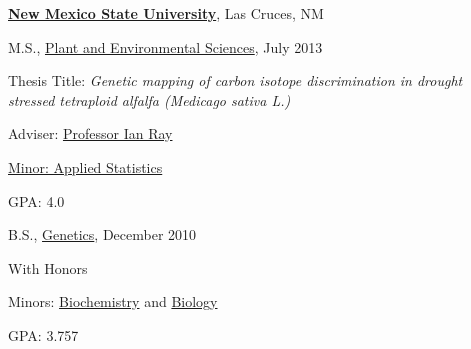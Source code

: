 \documentclass[10pt]{article}
\renewcommand{\section}[1]{\pagebreak[3]%
    \vspace{1.3\baselineskip}%
    \phantomsection\addcontentsline{toc}{section}{#1}%
    \noindent\llap{\scshape\smash{\parbox[t]{\marginparwidth}{\hyphenpenalty=10000\raggedright #1}}}%
    \vspace{-\baselineskip}\par}
\newcommand{\blankline}{\quad\pagebreak[3]}
\begin{document}
\blankline
\href{https://www.nmsu.edu/}{\textbf{New Mexico State University}},
Las Cruces, NM
\begin{outerlist}

\item[] M.S.,
        \href{https://www.nmsu.edu/}
             {Plant and Environmental Sciences}, July 2013
        \begin{innerlist}
        \item Thesis Title: \emph{Genetic mapping of carbon isotope discrimination in drought stressed tetraploid alfalfa (\emph{Medicago sativa} L.)}
        \item Adviser:
              \href{http://aces.nmsu.edu/academics/pes/ian-ray.html}
                   {Professor Ian Ray}
        \item \href{http://nmsu.smartcatalogiq.com/en/2014-2015/Graduate-Catalog/College-of-Business/Applied-Statistics/DEGREE-Master-of-Science/MINOR-Applied-Statistics}
        			{Minor: Applied Statistics}
        \item GPA: 4.0
        \end{innerlist}

\item[] B.S.,
        \href{http://aces.nmsu.edu/academics/pes/genetics-degree.html}
             {Genetics}, December 2010
        \begin{innerlist}
        \item With Honors
        \item Minors: \href{http://nmsu.smartcatalogiq.com/en/2014-2015/Undergraduate-Catalog/College-of-Arts-and-Sciences/Chemistry-and-Biochemistry/MINORS/MINOR-Biochemistry}{Biochemistry} and \href{http://nmsu.smartcatalogiq.com/en/2014-2015/Undergraduate-Catalog/College-of-Arts-and-Sciences/Biology/MINORS/MINOR-Biology}{Biology}
        \item GPA: 3.757
        \end{innerlist}

\end{outerlist}



%
\end{document}
